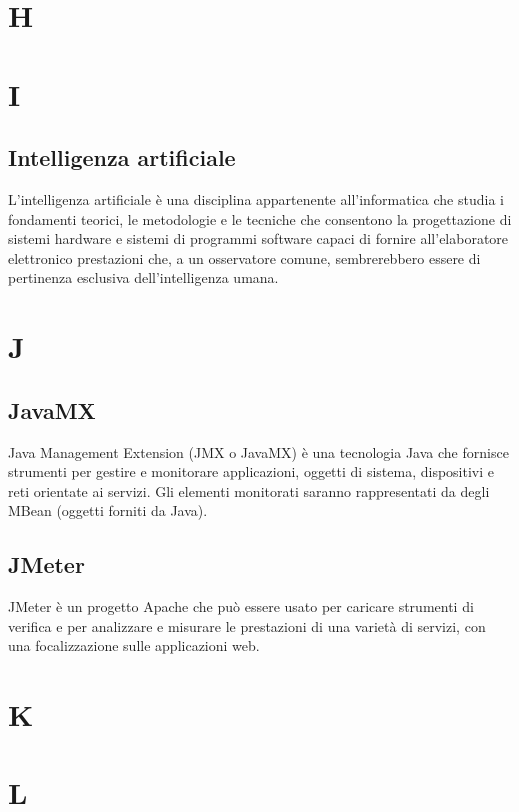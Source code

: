 \clearpage
\section*{H}

\clearpage
\section*{I}
	
\subsection*{Intelligenza artificiale}
L'intelligenza artificiale è una disciplina appartenente all'informatica che studia i fondamenti teorici, le metodologie e le tecniche che consentono la progettazione di sistemi hardware e sistemi di programmi software capaci di fornire all'elaboratore elettronico prestazioni che, a un osservatore comune, sembrerebbero essere di pertinenza esclusiva dell'intelligenza umana.

\clearpage
\section*{J}

\subsection*{JavaMX}
Java Management Extension (JMX o JavaMX) è una tecnologia Java che fornisce strumenti per gestire e monitorare applicazioni, oggetti di sistema, dispositivi e reti orientate ai servizi. Gli elementi monitorati saranno rappresentati da degli MBean (oggetti forniti da Java).

\subsection*{JMeter}
JMeter è un progetto Apache che può essere usato per caricare strumenti di verifica e per analizzare e misurare le prestazioni di una varietà di servizi, con una focalizzazione sulle applicazioni web.

\clearpage
\section*{K}

\clearpage
\section*{L}

